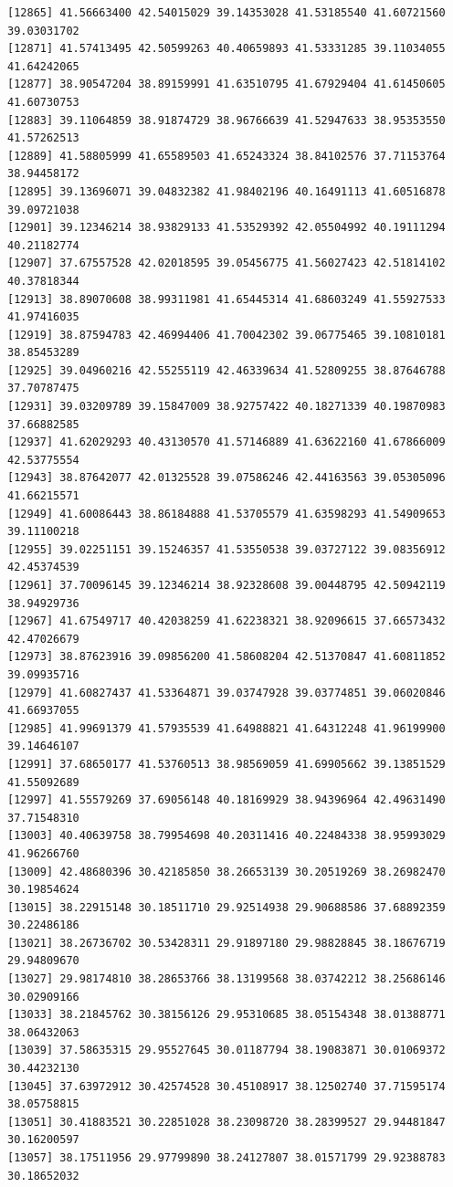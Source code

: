 \documentclass[
  letterpaper,
  DIV=11,
  numbers=noendperiod]{scrartcl}
\begin{document}
\begin{verbatim}
[12865] 41.56663400 42.54015029 39.14353028 41.53185540 41.60721560 39.03031702
[12871] 41.57413495 42.50599263 40.40659893 41.53331285 39.11034055 41.64242065
[12877] 38.90547204 38.89159991 41.63510795 41.67929404 41.61450605 41.60730753
[12883] 39.11064859 38.91874729 38.96766639 41.52947633 38.95353550 41.57262513
[12889] 41.58805999 41.65589503 41.65243324 38.84102576 37.71153764 38.94458172
[12895] 39.13696071 39.04832382 41.98402196 40.16491113 41.60516878 39.09721038
[12901] 39.12346214 38.93829133 41.53529392 42.05504992 40.19111294 40.21182774
[12907] 37.67557528 42.02018595 39.05456775 41.56027423 42.51814102 40.37818344
[12913] 38.89070608 38.99311981 41.65445314 41.68603249 41.55927533 41.97416035
[12919] 38.87594783 42.46994406 41.70042302 39.06775465 39.10810181 38.85453289
[12925] 39.04960216 42.55255119 42.46339634 41.52809255 38.87646788 37.70787475
[12931] 39.03209789 39.15847009 38.92757422 40.18271339 40.19870983 37.66882585
[12937] 41.62029293 40.43130570 41.57146889 41.63622160 41.67866009 42.53775554
[12943] 38.87642077 42.01325528 39.07586246 42.44163563 39.05305096 41.66215571
[12949] 41.60086443 38.86184888 41.53705579 41.63598293 41.54909653 39.11100218
[12955] 39.02251151 39.15246357 41.53550538 39.03727122 39.08356912 42.45374539
[12961] 37.70096145 39.12346214 38.92328608 39.00448795 42.50942119 38.94929736
[12967] 41.67549717 40.42038259 41.62238321 38.92096615 37.66573432 42.47026679
[12973] 38.87623916 39.09856200 41.58608204 42.51370847 41.60811852 39.09935716
[12979] 41.60827437 41.53364871 39.03747928 39.03774851 39.06020846 41.66937055
[12985] 41.99691379 41.57935539 41.64988821 41.64312248 41.96199900 39.14646107
[12991] 37.68650177 41.53760513 38.98569059 41.69905662 39.13851529 41.55092689
[12997] 41.55579269 37.69056148 40.18169929 38.94396964 42.49631490 37.71548310
[13003] 40.40639758 38.79954698 40.20311416 40.22484338 38.95993029 41.96266760
[13009] 42.48680396 30.42185850 38.26653139 30.20519269 38.26982470 30.19854624
[13015] 38.22915148 30.18511710 29.92514938 29.90688586 37.68892359 30.22486186
[13021] 38.26736702 30.53428311 29.91897180 29.98828845 38.18676719 29.94809670
[13027] 29.98174810 38.28653766 38.13199568 38.03742212 38.25686146 30.02909166
[13033] 38.21845762 30.38156126 29.95310685 38.05154348 38.01388771 38.06432063
[13039] 37.58635315 29.95527645 30.01187794 38.19083871 30.01069372 30.44232130
[13045] 37.63972912 30.42574528 30.45108917 38.12502740 37.71595174 38.05758815
[13051] 30.41883521 30.22851028 38.23098720 38.28399527 29.94481847 30.16200597
[13057] 38.17511956 29.97799890 38.24127807 38.01571799 29.92388783 30.18652032

\end{verbatim}
\end{document}
